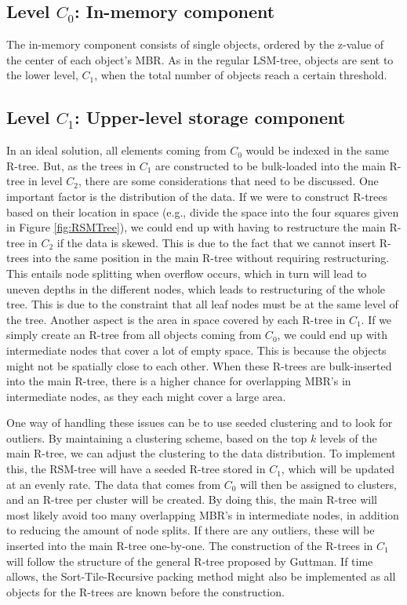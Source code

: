 \subsection{Level $C_0$: In-memory component}
The in-memory component consists of single objects, ordered by the z-value of the center of each object's MBR. As in the regular LSM-tree, objects are sent to the lower level, $C_1$, when the total number of objects reach a certain threshold. 

\subsection{Level $C_1$: Upper-level storage component}
In an ideal solution, all elements coming from $C_0$ would be indexed in the same R-tree. But, as the trees in $C_1$ are constructed to be bulk-loaded into the main R-tree in level $C_2$, there are some considerations that need to be discussed. One important factor is the distribution of the data. If we were to construct R-trees based on their location in space (e.g., divide the space into the four squares given in Figure \ref{fig:RSMTree}), we could end up with having to restructure the main R-tree in $C_2$ if the data is skewed. This is due to the fact that we cannot insert R-trees into the same position in the main R-tree without requiring restructuring. This entails node splitting when overflow occurs, which in turn will lead to uneven depths in the different nodes, which leads to restructuring of the whole tree. This is due to the constraint that all leaf nodes must be at the same level of the tree. Another aspect is the area in space covered by each R-tree in $C_1$. If we simply create an R-tree from all objects coming from $C_0$, we could end up with intermediate nodes that cover a lot of empty space. This is because the objects might not be spatially close to each other. When these R-trees are bulk-inserted into the main R-tree, there is a higher chance for overlapping MBR's in intermediate nodes, as they each might cover a large area. \newline

\noindent
One way of handling these issues can be to use seeded clustering\cite{SeededClustering} and to look for outliers. By maintaining a clustering scheme, based on the top $k$ levels of the main R-tree, we can adjust the clustering to the data distribution. To implement this, the RSM-tree will have a seeded R-tree stored in $C_1$, which will be updated at an evenly rate. The data that comes from $C_0$ will then be assigned to clusters, and an R-tree per cluster will be created. By doing this, the main R-tree will most likely avoid too many overlapping MBR's in intermediate nodes, in addition to reducing the amount of node splits. If there are any outliers, these will be inserted into the main R-tree one-by-one. The construction of the R-trees in $C_1$ will follow the structure of the general R-tree proposed by Guttman\cite{r-tree}. If time allows, the Sort-Tile-Recursive packing method\cite{STR} might also be implemented as all objects for the R-trees are known before the construction.

